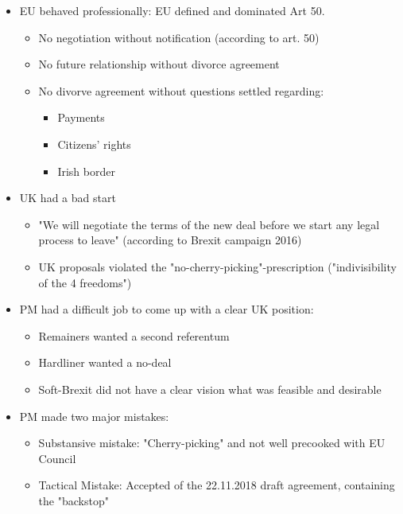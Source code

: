 \begin{itemize}
    \item EU behaved professionally: EU defined and dominated Art 50.
        \begin{itemize}
            \item No negotiation without notification (according to art. 50)
            \item No future relationship without divorce agreement
            \item No divorve agreement without questions settled regarding:
                \begin{itemize}
                    \item Payments
                    \item Citizens' rights
                    \item Irish border
                \end{itemize}
        \end{itemize}
    \item UK had a bad start
        \begin{itemize}
            \item "We will negotiate the terms of the new deal before we start
                any legal process to leave" (according to Brexit campaign 2016)
            \item UK proposals violated the "no-cherry-picking"-prescription
                ("indivisibility of the 4 freedoms")
        \end{itemize}
    \item PM had a difficult job to come up with a clear UK position:
        \begin{itemize}
            \item Remainers wanted a second referentum
            \item Hardliner wanted a no-deal
            \item Soft-Brexit did not have a clear vision what was feasible and
                desirable
        \end{itemize}
    \item PM made two major mistakes:
        \begin{itemize}
            \item Substansive mistake: "Cherry-picking" and not well precooked
                with EU Council
            \item Tactical Mistake: Accepted of the 22.11.2018 draft agreement,
                containing the "backstop"
        \end{itemize}

\end{itemize}
